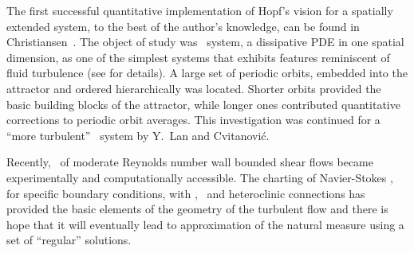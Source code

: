 The first successful quantitative implementation of Hopf's
vision for a spatially extended system, to the best of the
author's knowledge, can be found in
Christiansen~\etal{}. The object of study
was \KS\ system, a dissipative PDE in one spatial dimension,
as one of the simplest systems that exhibits features
reminiscent of fluid turbulence (see  for
details). A large set of periodic orbits, embedded into the
attractor and ordered hierarchically was located. Shorter orbits provided
the basic building blocks of the attractor, while longer ones
contributed quantitative corrections to periodic orbit averages.
This investigation was continued
for a ``more turbulent'' \KS\ system by Y.~Lan and
Cvitanovi\'c.

Recently, \statesp\ of moderate Reynolds number wall bounded
shear flows became experimentally and
computationally
accessible. The charting of Navier-Stokes \statesp, for
specific boundary conditions, with \eqva, \reqva\
and heteroclinic connections has provided the basic elements of
the geometry of the turbulent flow and there is hope that it
will eventually lead to approximation of the natural measure
using a set of ``regular'' solutions.
